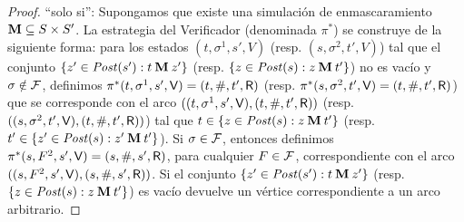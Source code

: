 \iffalse
\begin{proof} 
	``solo si'': Supongamos que existe una simulación de enmascaramiento $\mathbin{\mathbf{M}} \subseteq S \times S'$.
La estrategia del Verificador (denominada $\pi^*$) se construye de la siguiente forma:  para los estados $(t, \sigma^1, s', V)$ (resp. $(s, \sigma^2, t', V)$) tal que el conjunto $\{ z' \in \mathit{Post}(s'): t \mathbin{\mathbf{M}} z' \}$
(resp. $\{ z \in \mathit{Post}(s): z \mathbin{\mathbf{M}} t' \}$) no es vacío y $\sigma \notin \mathcal{F}$, definimos $\pi^*(t, \sigma^1, s', \mathsf{V}) = (t, \#, t', \mathsf{R})$ 
(resp. $\pi^*(s, \sigma^2, t', \mathsf{V}) = (t, \#, t', \mathsf{R})$) que se corresponde con el arco $((t, \sigma^1, s', \mathsf{V}), (t, \#, t', \mathsf{R}))$ (resp. $((s, \sigma^2, t', \mathsf{V}),(t, \#, t', \mathsf{R}))$) tal que $t \in \{ z \in \mathit{Post}(s): z \mathbin{\mathbf{M}} t' \}$ (resp. $t' \in \{ z' \in \mathit{Post}(s): z' \mathbin{\mathbf{M}} t' \}$).  Si $\sigma \in \mathcal{F}$, entonces definimos $\pi^*(s, F^2, s', \mathsf{V}) = (s, \#, s', \mathsf{R})$, para cualquier $F \in \mathcal{F}$, correspondiente con el arco $((s, F^2, s', \mathsf{V}),( s, \#, s', \mathsf{R}))$. Si el conjunto $\{ z' \in \mathit{Post}(s'): t \mathbin{\mathbf{M}} z' \}$  (resp. $\{ z \in \mathit{Post}(s): z \mathbin{\mathbf{M}} t' \}$) 
es vacío devuelve un vértice correspondiente a un arco arbitrario. 


\end{proof}
